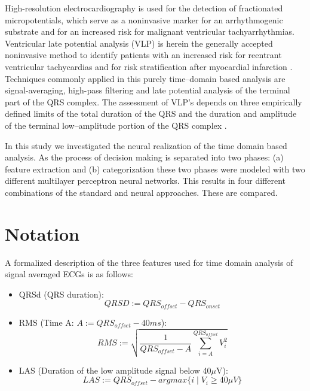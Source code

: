 \documentclass[twocolumn]{cinc}
\begin{document}
High-resolution electrocardiography is used for the detection of fractionated micropotentials, which serve
as a noninvasive marker for an arrhythmogenic substrate and for an increased risk for malignant 
ventricular tachy\-arrhythmias.
Ventricular late potential analysis (VLP) is herein the generally accepted noninvasive method to identify patients
with an increased risk for reentrant ventricular tachycardias and for risk stratification after myocardial
infarction \cite{med:gomes89,med:hoher91,med:simson81}. 
Techniques commonly applied in this purely time--domain based analysis are
signal-averaging, high-pass filtering and late potential analysis of the terminal part of the QRS complex.
The assessment of VLP's depends on three empirically defined limits of the total duration of the QRS and the 
duration and amplitude of the terminal low--amplitude portion of the QRS complex \cite{med:breithardt86,med:breithardt91}.

In this study we investigated the neural realization of the time domain based analysis.
As the process of decision making is separated into two phases: (a) feature extraction and (b) categorization
these two phases were modeled with two different multilayer perceptron neural networks. 
This results in four different combinations of the standard and neural approaches. These are compared.



\section{Notation}

A formalized description of the three features used for time domain analysis of signal averaged
ECGs is as follows:

\vspace*{-2cm}
\centerline{}
\vspace*{-7.5cm}        
{\small
\begin{itemize}
\item QRSd (QRS duration):
\[
 QRSD := QRS_{offset} - QRS_{onset}
\]
\item RMS (Time A: $A:= QRS_{offset} - 40ms$): 
\[
RMS := \sqrt{\frac{1}{QRS_{offset} - A} \sum_{i=A}^{QRS_{offset}} V_i^2}
\]
\item LAS (Duration of the low amplitude signal below 40$\mu$V):
\[
LAS := QRS_{offset} - argmax \{ i \; | \; V_i \ge 40 \mu V \}
\] 
\end{itemize}}
    
\end{document}

